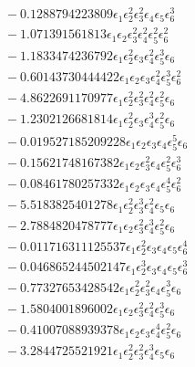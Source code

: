 \documentclass[10pt]{article}
\begin{document}
\begin{align*}
&{}  - 0.1288794223809 \epsilon_{1} \epsilon_{2}^{2} \epsilon_{3}^{2} \epsilon_{4} \epsilon_{5} \epsilon_{6}^{3} \\
&{}  - 1.071391561813 \epsilon_{1} \epsilon_{2} \epsilon_{3}^{2} \epsilon_{4}^{2} \epsilon_{5}^{2} \epsilon_{6}^{2} \\
&{}  - 1.1833474236792 \epsilon_{1} \epsilon_{2}^{2} \epsilon_{3} \epsilon_{4}^{2} \epsilon_{5}^{3} \epsilon_{6} \\
&{}  - 0.60143730444422 \epsilon_{1} \epsilon_{2} \epsilon_{3} \epsilon_{4}^{2} \epsilon_{5}^{3} \epsilon_{6}^{2} \\
&{}  - 4.8622691170977 \epsilon_{1} \epsilon_{2}^{2} \epsilon_{3}^{2} \epsilon_{4}^{2} \epsilon_{5}^{2} \epsilon_{6} \\
&{}  - 1.2302126681814 \epsilon_{1} \epsilon_{2}^{2} \epsilon_{3} \epsilon_{4}^{3} \epsilon_{5}^{2} \epsilon_{6} \\
&{}  - 0.019527185209228 \epsilon_{1} \epsilon_{2} \epsilon_{3} \epsilon_{4} \epsilon_{5}^{5} \epsilon_{6} \\
&{}  - 0.15621748167382 \epsilon_{1} \epsilon_{2} \epsilon_{3}^{2} \epsilon_{4} \epsilon_{5}^{2} \epsilon_{6}^{3} \\
&{}  - 0.08461780257332 \epsilon_{1} \epsilon_{2} \epsilon_{3} \epsilon_{4} \epsilon_{5}^{4} \epsilon_{6}^{2} \\
&{}  - 5.5183825401278 \epsilon_{1} \epsilon_{2}^{2} \epsilon_{3}^{3} \epsilon_{4}^{2} \epsilon_{5} \epsilon_{6} \\
&{}  - 2.7884820478777 \epsilon_{1} \epsilon_{2} \epsilon_{3}^{2} \epsilon_{4}^{3} \epsilon_{5}^{2} \epsilon_{6} \\
&{}  - 0.011716311125537 \epsilon_{1} \epsilon_{2}^{2} \epsilon_{3} \epsilon_{4} \epsilon_{5} \epsilon_{6}^{4} \\
&{}  - 0.046865244502147 \epsilon_{1} \epsilon_{2}^{3} \epsilon_{3} \epsilon_{4} \epsilon_{5} \epsilon_{6}^{3} \\
&{}  - 0.77327653428542 \epsilon_{1} \epsilon_{2}^{2} \epsilon_{3}^{2} \epsilon_{4} \epsilon_{5}^{3} \epsilon_{6} \\
&{}  - 1.5804001896002 \epsilon_{1} \epsilon_{2} \epsilon_{3}^{2} \epsilon_{4}^{2} \epsilon_{5}^{3} \epsilon_{6} \\
&{}  - 0.41007088939378 \epsilon_{1} \epsilon_{2} \epsilon_{3} \epsilon_{4}^{4} \epsilon_{5}^{2} \epsilon_{6} \\
&{}  - 3.2844725521921 \epsilon_{1} \epsilon_{2}^{2} \epsilon_{3}^{2} \epsilon_{4}^{3} \epsilon_{5} \epsilon_{6} \\

\end{align*}
\end{document}
